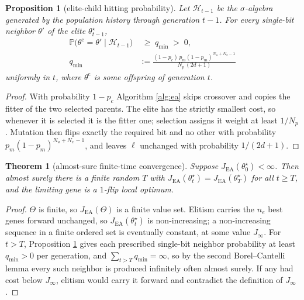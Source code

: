 \documentclass[letterpaper, 10pt, conference]{ieeeconf}
\newtheorem{proposition}{Proposition}
\newtheorem{theorem}{Theorem}
\begin{document}
\begin{proposition}[elite-child hitting probability]\label{prop:elite-hit}
Let $\mathcal{H}_{t-1}$ be the $\sigma$-algebra generated by the population
history through generation $t-1$. For every single-bit neighbor $\theta'$ of the
elite $\theta^\star_{t-1}$,
\begin{equation}\label{eq:qmin}
\begin{aligned}
  \mathbb{P}\bigl(\theta^{\mathrm{c}} = \theta' \mid \mathcal{H}_{t-1}\bigr)
  &\;\geq\; q_{\min} \;>\;0,\\
  q_{\min} &:= \frac{(1-p_c)\,p_m(1-p_m)^{N_u+N_x-1}}{N_p\,(2d+1)}
\end{aligned}
\end{equation}
uniformly in $t$, where $\theta^{\mathrm{c}}$ is some offspring of generation $t$.
\end{proposition}
\begin{proof}
With probability $1-p_c$ Algorithm \ref{alg:ea} skips crossover and copies the
fitter of the two selected parents. The elite has the strictly smallest cost, so
whenever it is selected it is the fitter one; selection assigns it weight at least
$1/N_p$. Mutation then flips exactly the required bit and no other with
probability $p_m(1-p_m)^{N_u+N_x-1}$, and leaves $\ell$ unchanged with probability
$1/(2d+1)$.
\end{proof}

\begin{theorem}[almost-sure finite-time convergence]\label{thm:conv}
Suppose $J_\mathrm{EA}(\theta^\star_0)<\infty$. Then almost surely there is a
finite random $T$ with $J_\mathrm{EA}(\theta^\star_t) = J_\mathrm{EA}(\theta^\star_T)$
for all $t\geq T$, and the limiting gene is a $1$-flip local optimum.
\end{theorem}
\begin{proof}
$\Theta$ is finite, so $J_\mathrm{EA}(\Theta)$ is a finite value set. Elitism
carries the $n_e$ best genes forward unchanged, so $J_\mathrm{EA}(\theta^\star_t)$
is non-increasing; a non-increasing sequence in a finite ordered set is eventually
constant, at some value $J_\infty$. For $t>T$, Proposition \ref{prop:elite-hit}
gives each prescribed single-bit neighbor probability at least $q_{\min}>0$ per
generation, and $\sum_{t>T}q_{\min}=\infty$, so by the second Borel--Cantelli
lemma every such neighbor is produced infinitely often almost surely. If any had
cost below $J_\infty$, elitism would carry it forward and contradict the
definition of $J_\infty$.
\end{proof}
\end{document}
